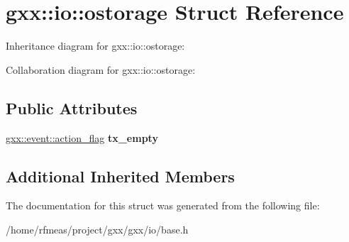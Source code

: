 \hypertarget{structgxx_1_1io_1_1ostorage}{}\section{gxx\+:\+:io\+:\+:ostorage Struct Reference}
\label{structgxx_1_1io_1_1ostorage}


Inheritance diagram for gxx\+:\+:io\+:\+:ostorage\+:


Collaboration diagram for gxx\+:\+:io\+:\+:ostorage\+:
\subsection*{Public Attributes}
\begin{DoxyCompactItemize}
\item 
\hyperlink{classgxx_1_1event_1_1action__flag}{gxx\+::event\+::action\+\_\+flag} {\bfseries tx\+\_\+empty}\hypertarget{structgxx_1_1io_1_1ostorage_a94330948f69f2379995eca834def5666}{}\label{structgxx_1_1io_1_1ostorage_a94330948f69f2379995eca834def5666}

\end{DoxyCompactItemize}
\subsection*{Additional Inherited Members}


The documentation for this struct was generated from the following file\+:\begin{DoxyCompactItemize}
\item 
/home/rfmeas/project/gxx/gxx/io/base.\+h\end{DoxyCompactItemize}
